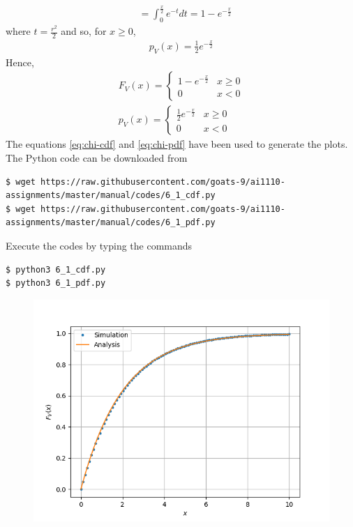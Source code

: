 \documentclass[journal,12pt,twocolumn]{IEEEtran}
\renewcommand\thesection{\arabic{section}}
\begin{document}
\begin{enumerate}[label=\thesection.\arabic*
,ref=\thesection.\theenumi]
\begin{align}
			&= \int_{0}^{\frac{x}{2}}e^{-t}dt = 1 - e^{-\frac{x}{2}}
		\end{align}
where $t = \frac{r^2}{2}$ and so, for $x \geq 0$, 
		\begin{align}
			p_V(x) = \frac{1}{2}e^{-\frac{x}{2}}
		\end{align}
Hence, 
		\begin{align}
			F_V(x) = 
			\begin{cases}
				1 - e^{-\frac{x}{2}} & x \geq 0 \\
				0 & x < 0 
			\end{cases} \label{eq:chi-cdf} \\
			p_V(x) = 
			\begin{cases}
				\frac{1}{2}e^{-\frac{x}{2}} & x \geq 0 \\
				0 & x < 0
			\end{cases} \label{eq:chi-pdf} 
		\end{align}
The equations \eqref{eq:chi-cdf} and \eqref{eq:chi-pdf} have been used to generate the plots. The Python code can be downloaded from
\begin{lstlisting}
$ wget https://raw.githubusercontent.com/goats-9/ai1110-assignments/master/manual/codes/6_1_cdf.py
$ wget https://raw.githubusercontent.com/goats-9/ai1110-assignments/master/manual/codes/6_1_pdf.py
\end{lstlisting}
Execute the codes by typing the commands
\begin{lstlisting}
$ python3 6_1_cdf.py
$ python3 6_1_pdf.py
\end{lstlisting}
\begin{figure}[!htb]
	\includegraphics[width=\columnwidth]{figs/6_1_cdf.png}

\end{figure}
\end{enumerate}
\end{document}
